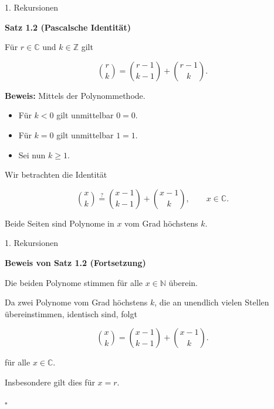 \documentclass{beamer}
\begin{document}
\begin{frame}{1. Rekursionen}

\textbf{Satz 1.2 (Pascalsche Identität)}

\vspace{0.3cm}

Für \(r\in\mathbb{C}\) und \(k\in\mathbb{Z}\) gilt

\[
\binom{r}{k}
=
\binom{r-1}{k-1}
+
\binom{r-1}{k}.
\]

\vspace{0.5cm}

\textbf{Beweis:} Mittels der Polynommethode.

\begin{itemize}
    \item Für \(k<0\) gilt unmittelbar \(0=0\).

    \item Für \(k=0\) gilt unmittelbar \(1=1\).

    \item Sei nun \(k\geq 1\).
\end{itemize}

Wir betrachten die Identität

\[
\binom{x}{k}
\stackrel{?}{=}
\binom{x-1}{k-1}
+
\binom{x-1}{k},
\qquad x\in\mathbb{C}.
\]

Beide Seiten sind Polynome in \(x\) vom Grad höchstens \(k\).

\end{frame}

\begin{frame}{1. Rekursionen}

\textbf{Beweis von Satz 1.2 (Fortsetzung)}

Die beiden Polynome stimmen für alle
\(x\in\mathbb{N}\) überein.

Da zwei Polynome vom Grad höchstens \(k\),
die an unendlich vielen Stellen übereinstimmen,
identisch sind, folgt

\[
\binom{x}{k}
=
\binom{x-1}{k-1}
+
\binom{x-1}{k}.
\]

für alle \(x\in\mathbb{C}\).

Insbesondere gilt dies für \(x=r\).

\hfill\(\square\)

\end{frame}
\end{document}
